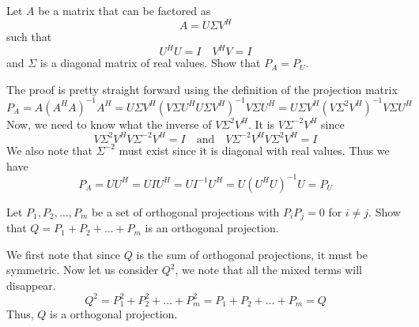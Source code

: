 \documentclass{homework}
\begin{document}
\begin{problem}
  Let $A$ be a matrix that can be factored as
  \[ A = U\Sigma V^H\]
  such that
  \[ U^H U = I \quad V^HV = I\]
  and $\Sigma$ is a diagonal matrix of real values. Show that $P_A = P_U$.
\end{problem}

\begin{solution}
  The proof is pretty straight forward using the definition of the projection matrix
  \[ P_A = A(A^HA)^{-1}A^H = U\Sigma V^H(V\Sigma U^HU\Sigma V^H)^{-1}V\Sigma U^H = U\Sigma V^H(V\Sigma^2 V^H)^{-1}V\Sigma U^H \]
  Now, we need to know what the inverse of $V\Sigma^2 V^{H}$. It is $V\Sigma^{-2}V^{H}$ since
  \[ V\Sigma^2 V^{H} V\Sigma^{-2}V^{H} = I \quad \text{and} \quad V\Sigma^{-2}V^H V \Sigma^2 V^{H} = I\]
  We also note that $\Sigma^{-2}$ must exist since it is diagonal with real values. Thus we have
  \[P_A = UU^H = UIU^H = UI^{-1}U^H = U(U^HU)^{-1}U = P_U\]
\end{solution}

\begin{problem}
  Let $P_1, P_2, \dots, P_m$ be a set of orthogonal projections with $P_iP_j = 0$ for $i \neq j$. Show that $Q = P_1 + P_2 + \dots + P_m$ is an orthogonal projection. 
\end{problem}

\begin{solution}
  We first note that since $Q$ is the sum of orthogonal projections, it must be symmetric. Now let us consider $Q^2$, we note that all the mixed terms will disappear.
  \[ Q^2 = P_1^2 + P_2^2 + \dots + P_m^2 =  P_1 + P_2 + \dots + P_m = Q\]
  Thus, $Q$ is a orthogonal projection.
\end{solution}

\begin{problem}
  
\end{problem}




\end{document}
